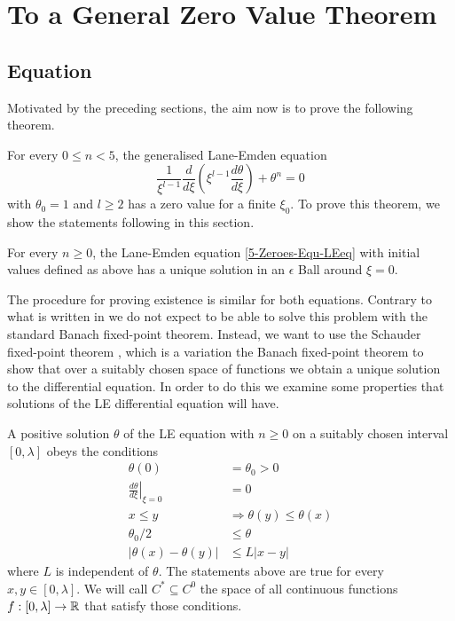 \section{To a General Zero Value Theorem}
\subsection{\texorpdfstring{}{LE} Equation}
Motivated by the preceding sections, the aim now is to prove the following theorem.
\begin{theorem}
	\label{5-Zeroes-The-Lane-EmdenFiniteBoundary}
	For every $0\leq n<5$, the generalised Lane-Emden equation
	\begin{equation}
		\frac{1}{\xi^{l-1}}\frac{d}{d\xi}\left(\xi^{l-1}\frac{d\theta}{d\xi}\right)+\theta^n=0
		\label{5-Zeroes-Equ-LEeq}
	\end{equation}
	with $\theta_0=1$ and $l\geq2$ has a zero value for a finite $\xi_0$.
	To prove this theorem, we show the statements following in this section.
\end{theorem}
\begin{lemma}
	\label{5-Zeroes-Lem-Lane-Emden-Local-Existence}
	For every $n\geq0$, the Lane-Emden equation \ref{5-Zeroes-Equ-LEeq} with initial values defined as above has a unique solution in an $\epsilon$ Ball around $\xi=0$.
\end{lemma}\noindent
The procedure for proving existence is similar for both equations.
Contrary to what is written in \cite[p.~50]{quittnerSuperlinearParabolicProblems2007} we do not expect to be able to solve this problem with the standard Banach fixed-point theorem.
Instead, we want to use the Schauder fixed-point theorem \cite{schauderFixpunktsatzFunktionalraumen1930}, which is a variation the Banach fixed-point theorem to show that over a suitably chosen space of functions we obtain a unique solution to the differential equation.
In order to do this we examine some properties that solutions of the \ac{LE} differential equation will have.
\begin{lemma}
	\label{5-Zeroes-Lem-LE-Conditions}
	A positive solution $\theta$ of the \ac{LE} equation with $n\geq0$ on a suitably chosen interval $[0,\lambda]$ obeys the conditions
	\begin{align}
		\theta(0) 					&= \theta_0>0\label{5-Zeroes-Equ-LE-Conditions-Initial-1}\\
		\left.\frac{d\theta}{d\xi}\right|_{\xi=0} &= 0 \label{5-Zeroes-Equ-LE-Conditions-Initial-2}\\
		x\leq y 					&\Rightarrow \theta(y)\leq\theta(x)\label{5-Zeroes-Equ-LE-Conditions-3}\\
		\theta_0/2					&\leq \theta \label{5-Zeroes-Equ-LE-Conditions-4}\\
		|\theta(x)-\theta(y)|		&\leq L|x-y|\label{5-Zeroes-Equ-LE-Conditions-5}
	\end{align}
	where $L$ is independent of $\theta$.
	The statements above are true for every $x,y\in[0,\lambda]$.
	We will call $C^*\subseteq C^0$ the space of all continuous functions $f:[0,\lambda]\rightarrow\mathbb{R}$ that satisfy those conditions.
\end{lemma}
